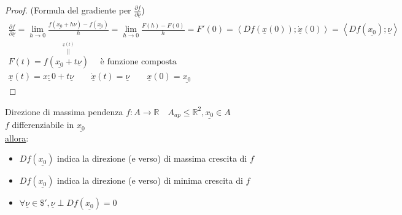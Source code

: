 \documentclass[a4paper, oneside]{article}
\begin{document}
        \begin{proof}
            (Formula del gradiente per $\frac{\partial f}{\partial \underline{\nu}}$)\\
            \begin{gather*}
                \frac{\partial f}{\partial \underline{\nu}} = \lim_{h \to 0} \frac{f(\underline{x_0}+h \nu)-f(\underline{x_0})}{h} = \lim_{h \to 0}\frac{F(h)-F(0)}{h} = F'(0) = \left\langle Df(\underline{x}(0)); \underline{\dot{x}}(0) \right\rangle = \left\langle Df(\underline{x_0});\underline{\nu} \right\rangle\\
                F(t) = f\overset{\overset{\underline{x}(t)}{||}}{(\underline{x_0}+t \underline{\nu})} \quad \text{ è funzione composta}\\
                \underline{x}(t) = \underline{x:0} + t \underline{\nu} \qquad \underline{\dot{x}}(t) = \underline{\nu} \qquad \underline{x}(0) = \underline{x_0}  
            \end{gather*}
        \end{proof}

        \begin{theorem}
            Direzione di massima pendenza
             $f:A \to \mathbb{R} \quad A_{ap} \leq \mathbb{R}^2,\underline{x_0} \in A$\\
             $f$ differenziabile in $\underline{x_0}$\\
            \underline{allora}:
            \begin{itemize}
                \item $Df(\underline{x_0})$ indica la direzione (e verso) di massima crescita di $f$
                \item $Df(\underline{x_0})$ indica la direzione (e verso) di minima crescita di $f$
                \item $\forall \underline{\nu} \in \mathdollar' , \underline{\nu} \perp Df(\underline{x_0}) = 0$
            \end{itemize}
        \end{theorem}
\end{document}
